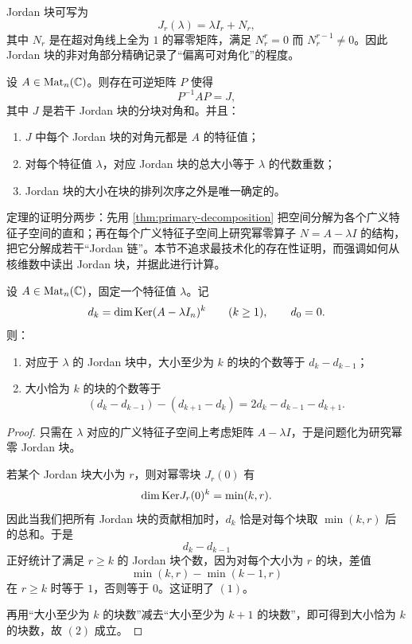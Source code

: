 Jordan 块可写为
\[
J_r(\lambda)=\lambda I_r+N_r,
\]
其中 \(N_r\) 是在超对角线上全为 \(1\) 的幂零矩阵，满足 \(N_r^r=0\) 而 \(N_r^{r-1}\neq 0\)。因此 Jordan 块的非对角部分精确记录了“偏离可对角化”的程度。

\begin{theorem}
设 \(A\in \mathrm{Mat}_n(\mathbb{C})\)。则存在可逆矩阵 \(P\) 使得
\[
P^{-1}AP=J,
\]
其中 \(J\) 是若干 Jordan 块的分块对角和。并且：
\begin{enumerate}[label=(\arabic*), leftmargin=2.4em]
  \item \(J\) 中每个 Jordan 块的对角元都是 \(A\) 的特征值；
  \item 对每个特征值 \(\lambda\)，对应 Jordan 块的总大小等于 \(\lambda\) 的代数重数；
  \item Jordan 块的大小在块的排列次序之外是唯一确定的。
\end{enumerate}
\end{theorem}

\begin{remark}
定理的证明分两步：先用 \cref{thm:primary-decomposition} 把空间分解为各个广义特征子空间的直和；再在每个广义特征子空间上研究幂零算子 \(N=A-\lambda I\) 的结构，把它分解成若干“Jordan 链”。本节不追求最技术化的存在性证明，而强调如何从核维数中读出 Jordan 块，并据此进行计算。
\end{remark}

\begin{proposition}\label{prop:jordan-kernel-count}
设 \(A\in \mathrm{Mat}_n(\mathbb{C})\)，固定一个特征值 \(\lambda\)。记
\[
d_k=\dim \mathrm{Ker}(A-\lambda I_n)^k\qquad (k\ge 1),\qquad d_0=0.
\]
则：
\begin{enumerate}[label=(\arabic*), leftmargin=2.4em]
  \item 对应于 \(\lambda\) 的 Jordan 块中，大小至少为 \(k\) 的块的个数等于 \(d_k-d_{k-1}\)；
  \item 大小恰为 \(k\) 的块的个数等于
  \[
  (d_k-d_{k-1})-(d_{k+1}-d_k)=2d_k-d_{k-1}-d_{k+1}.
  \]
\end{enumerate}
\end{proposition}

\begin{proof}
只需在 \(\lambda\) 对应的广义特征子空间上考虑矩阵 \(A-\lambda I\)，于是问题化为研究幂零 Jordan 块。

若某个 Jordan 块大小为 \(r\)，则对幂零块 \(J_r(0)\) 有
\[
\dim\mathrm{Ker} J_r(0)^k=\min(k,r).
\]
因此当我们把所有 Jordan 块的贡献相加时，\(d_k\) 恰是对每个块取 \(\min(k,r)\) 后的总和。于是
\[
d_k-d_{k-1}
\]
正好统计了满足 \(r\ge k\) 的 Jordan 块个数，因为对每个大小为 \(r\) 的块，差值
\[
\min(k,r)-\min(k-1,r)
\]
在 \(r\ge k\) 时等于 \(1\)，否则等于 \(0\)。这证明了 \((1)\)。

再用“大小至少为 \(k\) 的块数”减去“大小至少为 \(k+1\) 的块数”，即可得到大小恰为 \(k\) 的块数，故 \((2)\) 成立。
\end{proof}

